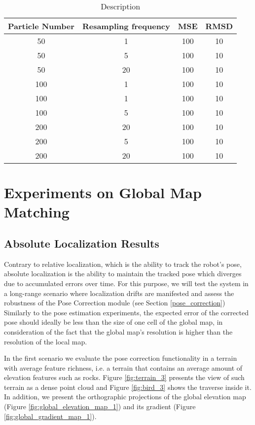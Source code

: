 \begin{table}
    \centering
    \begin{tabular}{| c | c || c | c |}
        \hline
        Particle Number & Resampling frequency & MSE & RMSD \\
        \hline
        \hline
        50 & 1 & 100 & 10 \\
        50 & 5 & 100 & 10 \\
        50 & 20 & 100 & 10 \\
        100 & 1 & 100 & 10 \\
        100 & 1 & 100 & 10 \\
        100 & 5 & 100 & 10 \\
        200 & 20 & 100 & 10 \\
        200 & 5 & 100 & 10 \\
        200 & 20 & 100 & 10 \\
        \hline
    \end{tabular}
    \caption[Name]{
        Description
    }
    \label{table:metrics_1}
\end{table}


\section{Experiments on Global Map Matching}

\subsection{Absolute Localization Results}

Contrary to relative localization, which is the ability to track the robot's
pose, absolute localization is the ability to maintain the tracked pose
which diverges due to accumulated errors over time.
For this purpose, we will test the system in a long-range
scenario where localization drifts are manifested and assess the robustness
of the Pose Correction module (see Section \ref{pose_correction})
Similarly to the pose estimation experiments, the expected error of the
corrected pose should ideally be less than the size of one cell of the global
map, in consideration of the fact that the global map's resolution is higher
than the resolution of the local map.

In the first scenario we evaluate the pose correction functionality in a
terrain with average feature richness, i.e. a terrain that contains
an average amount of elevation features such as rocks.
Figure \ref{fig:terrain_3} presents the view of such terrain as a dense
point cloud and Figure \ref{fig:bird_3} shows the traverse inside it.
In addition, we present the orthographic projections of the global
elevation map (Figure \ref{fig:global_elevation_map_1}) and its gradient
(Figure \ref{fig:global_gradient_map_1}).

